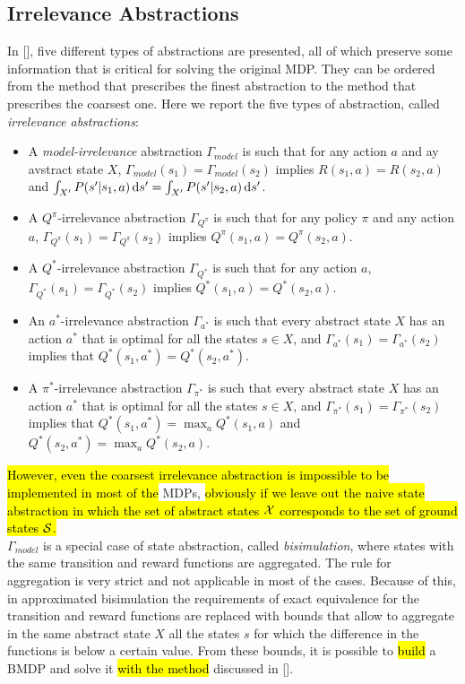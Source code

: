 \subsection{Irrelevance Abstractions}
In [\cite{lihong2006towards}], five different types of abstractions are presented, all of which preserve some information that is critical for solving the original \ac{MDP}. They can be ordered from the method that prescribes the finest abstraction to the method that prescribes the coarsest one. Here we report the five types of abstraction, called \emph{irrelevance abstractions}:
\begin{itemize}
	\item A \emph{model-irrelevance} abstraction $\Gamma_{model}$ is such that for any action $a$ and ay avstract state $X$, $\Gamma_{model}(s_1) = \Gamma_{model}(s_2)$ implies $R(s_1,a)=R(s_2,a)$ and $\int_{X'}P(s'|s_1,a) \,\mathrm{d} s'= \int_{X'}P(s'|s_2,a) \,\mathrm{d} s'$.
	\item A $Q^{\pi}$-irrelevance abstraction $\Gamma_{Q^{\pi}}$ is such that for any policy $\pi$ and any action $a$, $\Gamma_{Q^{\pi}}(s_1) = \Gamma_{Q^{\pi}}(s_2)$ implies $Q^{\pi}(s_1,a)=Q^{\pi}(s_2,a)$.
	\item A $Q^{*}$-irrelevance abstraction $\Gamma_{Q^{*}}$ is such that for any action $a$, $\Gamma_{Q^{*}}(s_1) = \Gamma_{Q^{*}}(s_2)$ implies $Q^{*}(s_1,a)=Q^{*}(s_2,a)$.
	\item An $a^{*}$-irrelevance abstraction $\Gamma_{a^{*}}$ is such that every abstract state $X$ has an action $a^{*}$ that is optimal for all the states $s \in X$, and $\Gamma_{a^{*}}(s_1) = \Gamma_{a^{*}}(s_2)$ implies that $Q^{*}(s_1,a^{*})=Q^{*}(s_2,a^{*})$.
	\item A $\pi^{*}$-irrelevance abstraction $\Gamma_{\pi^{*}}$ is such that every abstract state $X$ has an action $a^{*}$ that is optimal for all the states $s \in X$, and $\Gamma_{\pi^{*}}(s_1) = \Gamma_{\pi^{*}}(s_2)$ implies that $Q^{*}(s_1,a^{*})=\max_{a}Q^{*}(s_1,a)$ and $Q^{*}(s_2,a^{*})=\max_{a}Q^{*}(s_2,a)$.
\end{itemize}
\noindent \hl{However, even the coarsest irrelevance abstraction is impossible to be implemented in most of the} \ac{MDPs}, \hl{obviously if we leave out the naive state abstraction in which the set of abstract states $\mathcal{X}$ corresponds to the set of ground states $\mathcal{S}$.}\\
\newline
$\Gamma_{model}$ is a special case of state abstraction, called \emph{bisimulation}, where states with the same transition and reward functions are aggregated. The rule for aggregation is very strict and not applicable in most of the cases. Because of this, in approximated bisimulation the requirements of exact equivalence for the transition and reward functions are replaced with bounds that allow to aggregate in the same abstract state $X$ all the states $s$ for which the difference in the functions is below a certain value. From these bounds, it is possible to \hl{build} a \ac{BMDP} and solve it \hl{with the method} discussed in  [\cite{dean2013model}].\\
